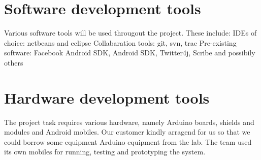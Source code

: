 \section{Software development tools}

Various software tools will be used througout the project. These include:
IDEs of choice: netbeans and eclipse
Collabaration tools: git, svn, trac
Pre-existing software: Facebook Android SDK,    Android SDK, Twitter4j, Scribe and possibily others

\section{Hardware development tools}

The project task requires various hardware, namely Arduino boards, shields and modules and Android mobiles. Our customer kindly arragend for us so that we could borrow some equipment Arduino equipment from the lab. The team used its own
mobiles for running, testing and prototyping the system.